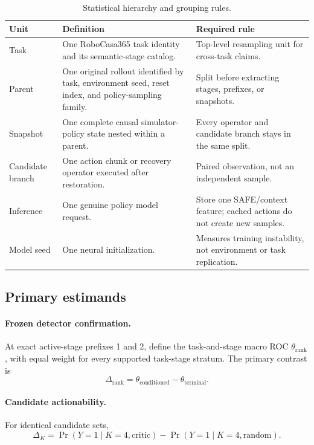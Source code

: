 \begin{table}[H]
\centering
\caption{Statistical hierarchy and grouping rules.}
\label{tab:hierarchy}
\small
\begin{tabularx}{\textwidth}{P{0.20\textwidth}P{0.34\textwidth}Y}
\toprule
Unit & Definition & Required rule \\
\midrule
Task & One RoboCasa365 task identity and its semantic-stage catalog. & Top-level resampling unit for cross-task claims. \\
Parent & One original rollout identified by task, environment seed, reset index, and policy-sampling family. & Split before extracting stages, prefixes, or snapshots. \\
Snapshot & One complete causal simulator-policy state nested within a parent. & Every operator and candidate branch stays in the same split. \\
Candidate branch & One action chunk or recovery operator executed after restoration. & Paired observation, not an independent sample. \\
Inference & One genuine policy model request. & Store one SAFE/context feature; cached actions do not create new samples. \\
Model seed & One neural initialization. & Measures training instability, not environment or task replication. \\
\bottomrule
\end{tabularx}
\end{table}

\subsection{Primary estimands}

\paragraph{Frozen detector confirmation.}
At exact active-stage prefixes 1 and 2, define the task-and-stage macro ROC $\theta_{\mathrm{rank}}$, with equal weight for every supported task-stage stratum. The primary contrast is
\begin{equation}
  \Delta_{\mathrm{rank}}
  = \theta_{\mathrm{conditioned}}-\theta_{\mathrm{terminal}}.
\end{equation}

\paragraph{Candidate actionability.}
For identical candidate sets,
\begin{equation}
  \Delta_K
  = \Pr(Y=1\mid K=4,\text{critic})
  -\Pr(Y=1\mid K=4,\text{random}).
\end{equation}

